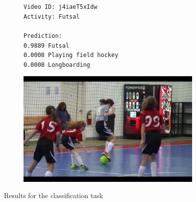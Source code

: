 \begin{figure}[H]
\begin{subfigure}[b]{.4\textwidth}
  \texttt{Video ID: j4iaeT5xIdw \\
    Activity: Futsal \\
    \\
    Prediction: \\
    0.9889	Futsal \\
    0.0008	Playing field hockey \\
    0.0008	Longboarding \\}
\end{subfigure}%
\begin{subfigure}[b]{.6\textwidth}
  \centering
\includegraphics[width=0.95\linewidth]{img/results/activity_classification/results_visualization_classification_12}
\end{subfigure}

\caption{Results for the classification task}
\label{fig:results_visualization_classification_annex_2}
\end{figure}


